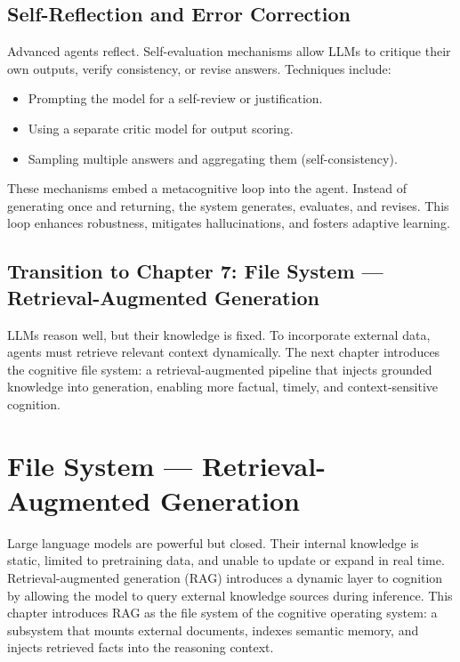 \documentclass{book}
\begin{document}
\section{Self-Reflection and Error Correction}

Advanced agents reflect. Self-evaluation mechanisms allow LLMs to critique their own outputs, verify consistency, or revise answers. Techniques include:

\begin{itemize}
  \item Prompting the model for a self-review or justification.
  \item Using a separate critic model for output scoring.
  \item Sampling multiple answers and aggregating them (self-consistency).
\end{itemize}

These mechanisms embed a metacognitive loop into the agent. Instead of generating once and returning, the system generates, evaluates, and revises. This loop enhances robustness, mitigates hallucinations, and fosters adaptive learning.

\section*{Transition to Chapter 7: File System — Retrieval-Augmented Generation}

LLMs reason well, but their knowledge is fixed. To incorporate external data, agents must retrieve relevant context dynamically. The next chapter introduces the cognitive file system: a retrieval-augmented pipeline that injects grounded knowledge into generation, enabling more factual, timely, and context-sensitive cognition.

\chapter{File System — Retrieval-Augmented Generation}

Large language models are powerful but closed. Their internal knowledge is static, limited to pretraining data, and unable to update or expand in real time. Retrieval-augmented generation (RAG) introduces a dynamic layer to cognition by allowing the model to query external knowledge sources during inference. This chapter introduces RAG as the file system of the cognitive operating system: a subsystem that mounts external documents, indexes semantic memory, and injects retrieved facts into the reasoning context.
\end{document}
